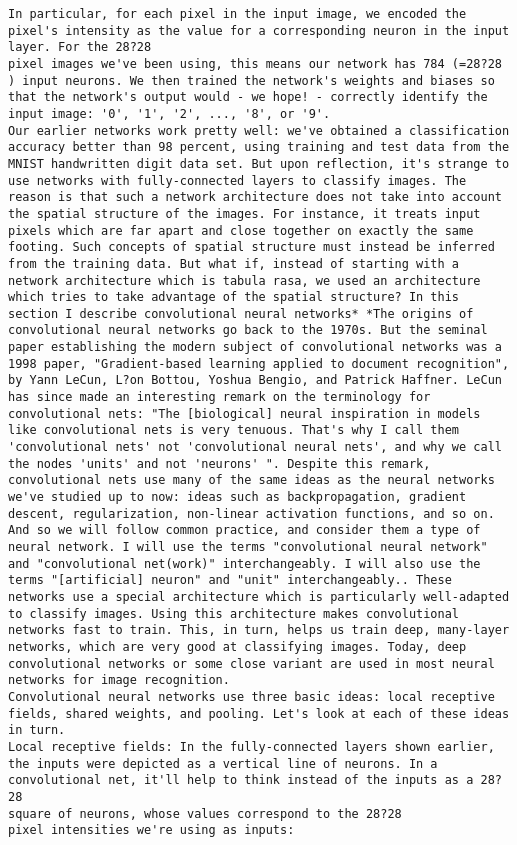 \begin{lstlisting}
In particular, for each pixel in the input image, we encoded the pixel's intensity as the value for a corresponding neuron in the input layer. For the 28?28
pixel images we've been using, this means our network has 784 (=28?28
) input neurons. We then trained the network's weights and biases so that the network's output would - we hope! - correctly identify the input image: '0', '1', '2', ..., '8', or '9'.
Our earlier networks work pretty well: we've obtained a classification accuracy better than 98 percent, using training and test data from the MNIST handwritten digit data set. But upon reflection, it's strange to use networks with fully-connected layers to classify images. The reason is that such a network architecture does not take into account the spatial structure of the images. For instance, it treats input pixels which are far apart and close together on exactly the same footing. Such concepts of spatial structure must instead be inferred from the training data. But what if, instead of starting with a network architecture which is tabula rasa, we used an architecture which tries to take advantage of the spatial structure? In this section I describe convolutional neural networks* *The origins of convolutional neural networks go back to the 1970s. But the seminal paper establishing the modern subject of convolutional networks was a 1998 paper, "Gradient-based learning applied to document recognition", by Yann LeCun, L?on Bottou, Yoshua Bengio, and Patrick Haffner. LeCun has since made an interesting remark on the terminology for convolutional nets: "The [biological] neural inspiration in models like convolutional nets is very tenuous. That's why I call them 'convolutional nets' not 'convolutional neural nets', and why we call the nodes 'units' and not 'neurons' ". Despite this remark, convolutional nets use many of the same ideas as the neural networks we've studied up to now: ideas such as backpropagation, gradient descent, regularization, non-linear activation functions, and so on. And so we will follow common practice, and consider them a type of neural network. I will use the terms "convolutional neural network" and "convolutional net(work)" interchangeably. I will also use the terms "[artificial] neuron" and "unit" interchangeably.. These networks use a special architecture which is particularly well-adapted to classify images. Using this architecture makes convolutional networks fast to train. This, in turn, helps us train deep, many-layer networks, which are very good at classifying images. Today, deep convolutional networks or some close variant are used in most neural networks for image recognition.
Convolutional neural networks use three basic ideas: local receptive fields, shared weights, and pooling. Let's look at each of these ideas in turn.
Local receptive fields: In the fully-connected layers shown earlier, the inputs were depicted as a vertical line of neurons. In a convolutional net, it'll help to think instead of the inputs as a 28?28
square of neurons, whose values correspond to the 28?28
pixel intensities we're using as inputs:


\end{lstlisting}
